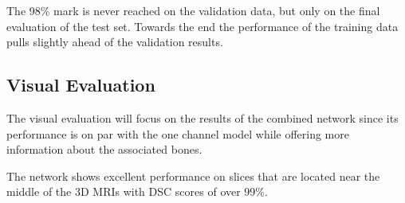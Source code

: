 The 98\% mark is never reached on the validation data, but only on the final evaluation of the test set. Towards the end the performance of the training data pulls slightly ahead of the validation results.

\subsection{Visual Evaluation}

The visual evaluation will focus on the results of the combined network since its performance is on par with the one channel model while offering more information about the associated bones.

The network shows excellent performance on slices that are located near the middle of the 3D MRIs with DSC scores of over 99\%.

